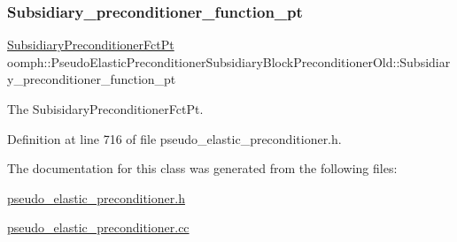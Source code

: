 \subsubsection{\texorpdfstring{Subsidiary\+\_\+preconditioner\+\_\+function\+\_\+pt}{Subsidiary\_preconditioner\_function\_pt}}
{\footnotesize\ttfamily \hyperlink{classoomph_1_1PseudoElasticPreconditionerSubsidiaryBlockPreconditionerOld_a85f57923e70244d5fde0538946eb8c3d}{Subsidiary\+Preconditioner\+Fct\+Pt} oomph\+::\+Pseudo\+Elastic\+Preconditioner\+Subsidiary\+Block\+Preconditioner\+Old\+::\+Subsidiary\+\_\+preconditioner\+\_\+function\+\_\+pt\hspace{0.3cm}{\ttfamily [private]}}



The Subisidary\+Preconditioner\+Fct\+Pt. 



Definition at line 716 of file pseudo\+\_\+elastic\+\_\+preconditioner.\+h.



The documentation for this class was generated from the following files\+:\begin{DoxyCompactItemize}
\item 
\hyperlink{pseudo__elastic__preconditioner_8h}{pseudo\+\_\+elastic\+\_\+preconditioner.\+h}\item 
\hyperlink{pseudo__elastic__preconditioner_8cc}{pseudo\+\_\+elastic\+\_\+preconditioner.\+cc}\end{DoxyCompactItemize}
